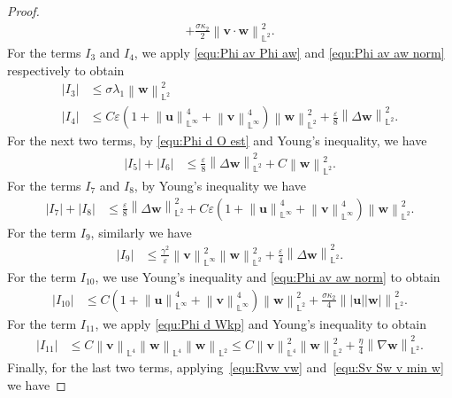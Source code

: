 \documentclass[11pt, reqno]{amsart}
\theoremstyle{definition}
\numberwithin{equation}{section}
\newcommand{\bff}{\boldsymbol}
\newcommand{\bb}{\mathbb}
\newcommand{\norm}[2]{\left\|{#1}\right\|_{#2}}
\newcommand{\abs}[1]{\left|{#1}\right|}
\begin{document}
\begin{proof}
\begin{align*}
    +
    \frac{\sigma \kappa_2}{2} \norm{\bff{v}\cdot \bff{w}}{\bb{L}^2}^2.
\end{align*}
For the terms $I_3$ and $I_4$, we apply \eqref{equ:Phi av Phi aw} and \eqref{equ:Phi av aw norm} respectively to obtain
\begin{align*}
    \abs{I_3}
    &\leq
    \sigma\lambda_1 \norm{\bff{w}}{\bb{L}^2}^2
    \\
    \abs{I_4}
    &\leq
    C\varepsilon \left(1+\norm{\bff{u}}{\bb{L}^\infty}^4 + \norm{\bff{v}}{\bb{L}^\infty}^4\right) \norm{\bff{w}}{\bb{L}^2}^2
    +
    \frac{\varepsilon}{8} \norm{\Delta \bff{w}}{\bb{L}^2}^2.
\end{align*}
For the next two terms, by \eqref{equ:Phi d O est} and Young's inequality, we have
\begin{align*}
    \abs{I_5}+\abs{I_6}
    &\leq
     \frac{\varepsilon}{8} \norm{\Delta \bff{w}}{\bb{L}^2}^2
     +
    C\norm{\bff{w}}{\bb{L}^2}^2.
\end{align*}
For the terms $I_7$ and $I_8$, by Young's inequality we have
\begin{align*}
    \abs{I_7}+\abs{I_8}
    &\leq
    \frac{\varepsilon}{8} \norm{\Delta \bff{w}}{\bb{L}^2}^2
    +
    C\varepsilon \left(1+ \norm{\bff{u}}{\bb{L}^\infty}^4 + \norm{\bff{v}}{\bb{L}^\infty}^4\right) \norm{\bff{w}}{\bb{L}^2}^2.
\end{align*}
For the term $I_9$, similarly we have
\begin{align*}
    \abs{I_9}
    &\leq
    \frac{\gamma^2}{\varepsilon} \norm{\bff{v}}{\bb{L}^\infty}^2 \norm{\bff{w}}{\bb{L}^2}^2
    +
    \frac{\varepsilon}{4}\norm{\Delta \bff{w}}{\bb{L}^2}^2.
\end{align*}
For the term $I_{10}$, we use Young's inequality and \eqref{equ:Phi av aw norm} to obtain
\begin{align*}
    \abs{I_{10}}
    &\leq 
    C\left(1+\norm{\bff{u}}{\bb{L}^\infty}^4+\norm{\bff{v}}{\bb{L}^\infty}^4\right) \norm{\bff{w}}{\bb{L}^2}^2
    +
    \frac{\sigma\kappa_2}{4} \norm{|\bff{u}||\bff{w}|}{\bb{L}^2}^2.
\end{align*}
For the term $I_{11}$, we apply \eqref{equ:Phi d Wkp} and Young's inequality to obtain
\begin{align*}
    \abs{I_{11}}
    &\leq
    C\norm{\bff{v}}{\bb{L}^4} \norm{\bff{w}}{\bb{L}^4} \norm{\bff{w}}{\bb{L}^2}
    \leq
    C\norm{\bff{v}}{\bb{L}^4}^2 \norm{\bff{w}}{\bb{L}^2}^2
    +
    \frac{\eta}{4} \norm{\nabla \bff{w}}{\bb{L}^2}^2.
\end{align*}
Finally, for the last two terms, applying~\eqref{equ:Rvw vw} and~\eqref{equ:Sv Sw v min w} we have

\end{proof}
\end{document}
